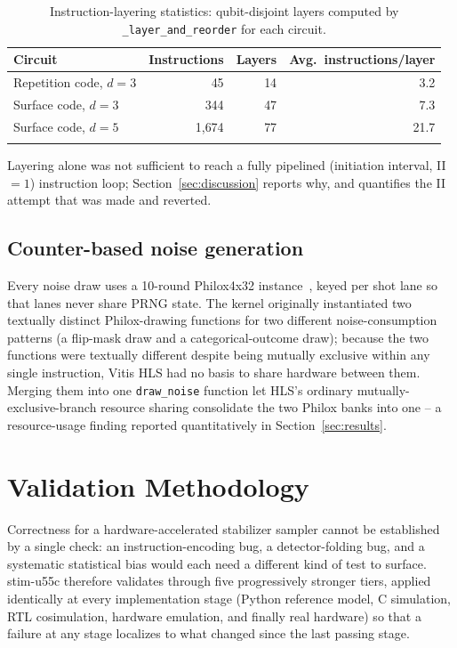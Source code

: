 \documentclass[pdflatex,sn-basic]{sn-jnl}
\begin{document}
\begin{table}[h]
\caption{Instruction-layering statistics: qubit-disjoint layers computed by \texttt{\_layer\_and\_reorder} for each circuit.}\label{tab:layering}
\begin{tabular}{@{}lrrr@{}}
\toprule
Circuit & Instructions & Layers & Avg.\ instructions/layer \\
\midrule
Repetition code, $d=3$ & 45 & 14 & 3.2 \\
Surface code, $d=3$ & 344 & 47 & 7.3 \\
Surface code, $d=5$ & 1{,}674 & 77 & 21.7 \\
\botrule
\end{tabular}
\end{table}

Layering alone was not sufficient to reach a fully pipelined (initiation interval, II$=1$) instruction loop; Section~\ref{sec:discussion} reports why, and quantifies the II attempt that was made and reverted.

\subsection{Counter-based noise generation}

Every noise draw uses a 10-round Philox4x32 instance~\cite{salmon2011parallel}, keyed per shot lane so that lanes never share PRNG state. The kernel originally instantiated two textually distinct Philox-drawing functions for two different noise-consumption patterns (a flip-mask draw and a categorical-outcome draw); because the two functions were textually different despite being mutually exclusive within any single instruction, Vitis HLS had no basis to share hardware between them. Merging them into one \texttt{draw\_noise} function let HLS's ordinary mutually-exclusive-branch resource sharing consolidate the two Philox banks into one -- a resource-usage finding reported quantitatively in Section~\ref{sec:results}.

\section{Validation Methodology}\label{sec:validation}

Correctness for a hardware-accelerated stabilizer sampler cannot be established by a single check: an instruction-encoding bug, a detector-folding bug, and a systematic statistical bias would each need a different kind of test to surface. stim-u55c therefore validates through five progressively stronger tiers, applied identically at every implementation stage (Python reference model, C simulation, RTL cosimulation, hardware emulation, and finally real hardware) so that a failure at any stage localizes to what changed since the last passing stage.
\end{document}
